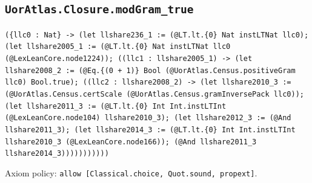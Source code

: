 \documentclass[11pt]{article}
\begin{document}
\subsection*{\texttt{UorAtlas.Closure.modGram\_true}}
\noindent\texttt{(\{llc0 : Nat\} -> (let llshare236\_1 := (@LT.lt.\{0\} Nat instLTNat llc0); (let llshare2005\_1 := (@LT.lt.\{0\} Nat instLTNat llc0 (@LexLeanCore.node1224)); ((llc1 : llshare2005\_1) -> (let llshare2008\_2 := (@Eq.\{(0 + 1)\} Bool (@UorAtlas.Census.positiveGram llc0) Bool.true); ((llc2 : llshare2008\_2) -> (let llshare2010\_3 := (@UorAtlas.Census.certScale (@UorAtlas.Census.gramInversePack llc0)); (let llshare2011\_3 := (@LT.lt.\{0\} Int Int.instLTInt (@LexLeanCore.node104) llshare2010\_3); (let llshare2012\_3 := (@And llshare2011\_3); (let llshare2014\_3 := (@LT.lt.\{0\} Int Int.instLTInt llshare2010\_3 (@LexLeanCore.node166)); (@And llshare2011\_3 llshare2014\_3)))))))))))}\par
\noindent Axiom policy: \texttt{allow [Classical.choice, Quot.sound, propext]}.\par
\end{document}
